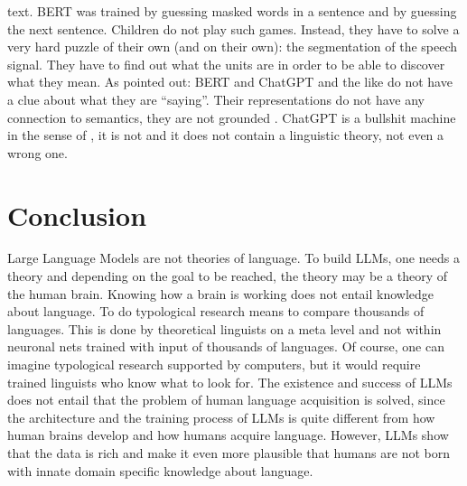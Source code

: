 text. BERT was trained by guessing masked words in a sentence and by guessing the next
sentence. Children do not play such games. Instead, they have to solve a very hard puzzle of their own (and on their own):
the segmentation of the speech signal. They have to find out what the units are in order to be able
to discover what they mean. 
%
As \citet{BK2020a} pointed
out: BERT and ChatGPT and the like do not have a clue about what they are ``saying''. Their representations do not have any
connection to semantics, they are not grounded \citep{BeulsVanEcke2024a}. ChatGPT is a bullshit machine in the sense of
\citet{HicksHumphriesSlater2024a}, it is not and it does not contain a linguistic theory, not even a
wrong one.
%


\section{Conclusion}

Large Language Models are not theories of language. To build LLMs, one needs a theory and depending
on the goal to be reached, the theory may be a theory of the human brain. Knowing how a brain is
working does not entail knowledge about language. To do typological research means to compare
thousands of languages. This is done by theoretical linguists on a meta level and not within
neuronal nets trained with input of thousands of languages. Of course, one can imagine typological
research supported by computers, but it would require trained linguists who know what to look for.
The existence and success of LLMs does not entail
that the problem of human language acquisition is solved, since the architecture and the training
process of LLMs is quite different from how human brains develop and how humans acquire
language. However, LLMs show that the data is rich and make it even more plausible that humans are
not born with innate domain specific knowledge about language.

